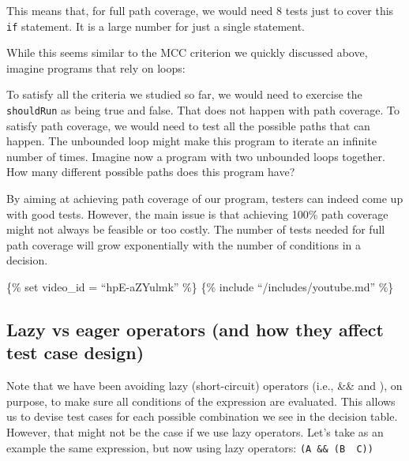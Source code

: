 This means that, for full path coverage, we would need 8 tests just to
cover this \texttt{if} statement. It is a large number for just a single
statement.

While this seems similar to the MCC criterion we quickly discussed
above, imagine programs that rely on loops:

\begin{Shaded}
\begin{Highlighting}[]
\NormalTok{;}
  \NormalTok{();}
  \NormalTok{();}

\NormalTok{();}
\NormalTok{\}}
\end{Highlighting}
\end{Shaded}

To satisfy all the criteria we studied so far, we would need to exercise
the \texttt{shouldRun} as being true and false. That does not happen
with path coverage. To satisfy path coverage, we would need to test all
the possible paths that can happen. The unbounded loop might make this
program to iterate an infinite number of times. Imagine now a program
with two unbounded loops together. How many different possible paths
does this program have?

By aiming at achieving path coverage of our program, testers can indeed
come up with good tests. However, the main issue is that achieving 100\%
path coverage might not always be feasible or too costly. The number of
tests needed for full path coverage will grow exponentially with the
number of conditions in a decision.

\{\% set video\_id = ``hpE-aZYulmk'' \%\} \{\% include
``/includes/youtube.md'' \%\}

\hypertarget{lazy-vs-eager-operators-and-how-they-affect-test-case-design}{%
\subsection{Lazy vs eager operators (and how they affect test case
design)}\label{lazy-vs-eager-operators-and-how-they-affect-test-case-design}}

Note that we have been avoiding lazy (short-circuit) operators (i.e.,
\&\& and \textbar\textbar), on purpose, to make sure all conditions of
the expression are evaluated. This allows us to devise test cases for
each possible combination we see in the decision table. However, that
might not be the case if we use lazy operators. Let's take as an example
the same expression, but now using lazy operators:
\texttt{(A\ \&\&\ (B\ \textbar{}\textbar{}\ C))}

